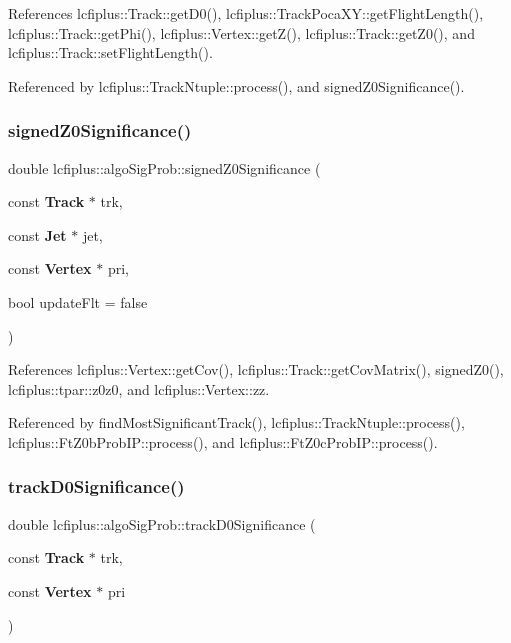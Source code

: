 References lcfiplus\+::\+Track\+::get\+D0(), lcfiplus\+::\+Track\+Poca\+X\+Y\+::get\+Flight\+Length(), lcfiplus\+::\+Track\+::get\+Phi(), lcfiplus\+::\+Vertex\+::get\+Z(), lcfiplus\+::\+Track\+::get\+Z0(), and lcfiplus\+::\+Track\+::set\+Flight\+Length().



Referenced by lcfiplus\+::\+Track\+Ntuple\+::process(), and signed\+Z0\+Significance().

\mbox{\label{namespacelcfiplus_1_1algoSigProb_adc2ab4e7161c938cb2d34f66b0650bc5}} 
\subsubsection{signed\+Z0\+Significance()}
{\footnotesize\ttfamily double lcfiplus\+::algo\+Sig\+Prob\+::signed\+Z0\+Significance (\begin{DoxyParamCaption}\item[{const \textbf{ Track} $\ast$}]{trk,  }\item[{const \textbf{ Jet} $\ast$}]{jet,  }\item[{const \textbf{ Vertex} $\ast$}]{pri,  }\item[{bool}]{update\+Flt = {\ttfamily false} }\end{DoxyParamCaption})}



References lcfiplus\+::\+Vertex\+::get\+Cov(), lcfiplus\+::\+Track\+::get\+Cov\+Matrix(), signed\+Z0(), lcfiplus\+::tpar\+::z0z0, and lcfiplus\+::\+Vertex\+::zz.



Referenced by find\+Most\+Significant\+Track(), lcfiplus\+::\+Track\+Ntuple\+::process(), lcfiplus\+::\+Ft\+Z0b\+Prob\+I\+P\+::process(), and lcfiplus\+::\+Ft\+Z0c\+Prob\+I\+P\+::process().

\mbox{\label{namespacelcfiplus_1_1algoSigProb_a36b1bb76590bcb1051f3ad625c23b920}} 
\subsubsection{track\+D0\+Significance()}
{\footnotesize\ttfamily double lcfiplus\+::algo\+Sig\+Prob\+::track\+D0\+Significance (\begin{DoxyParamCaption}\item[{const \textbf{ Track} $\ast$}]{trk,  }\item[{const \textbf{ Vertex} $\ast$}]{pri }\end{DoxyParamCaption})}



